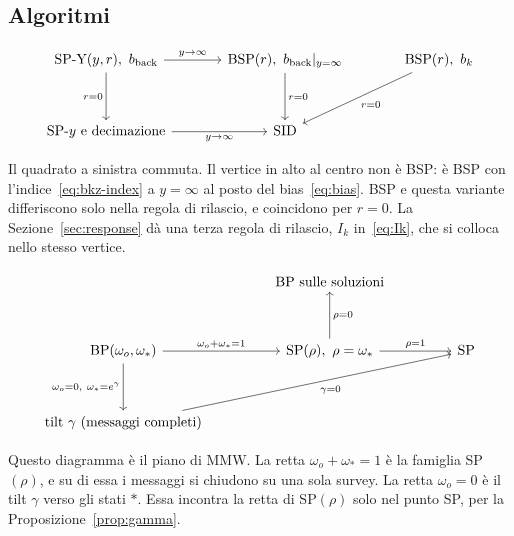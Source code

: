 \subsection{Algoritmi}

\begin{equation*}
\begin{tikzcd}[column sep=3.6em,row sep=3.4em]
\text{SP-Y}(y,r),\ b_{\mathrm{back}} \arrow[r,"y\to\infty"] \arrow[d,"r=0"'] & \text{BSP}(r),\ b_{\mathrm{back}}|_{y=\infty} \arrow[d,"r=0"] & \text{BSP}(r),\ b_k \arrow[dl,"r=0"] \\
\text{SP-}y\ \text{e decimazione} \arrow[r,"y\to\infty"'] & \text{SID} &
\end{tikzcd}
\end{equation*}

Il quadrato a sinistra commuta.
Il vertice in alto al centro non è BSP: è BSP con l'indice~\eqref{eq:bkz-index} a $y=\infty$ al posto del bias~\eqref{eq:bias}.
BSP e questa variante differiscono solo nella regola di rilascio, e coincidono per $r=0$.
La Sezione~\ref{sec:response} dà una terza regola di rilascio, $I_k$ in~\eqref{eq:Ik}, che si colloca nello stesso vertice.

\begin{equation*}
\begin{tikzcd}[column sep=4.4em,row sep=3.4em]
& \text{BP sulle soluzioni} & \\
\text{BP}(\omega_o,\omega_*) \arrow[r,"\omega_o+\omega_*=1"] \arrow[d,"{\omega_o=0,\ \omega_*=e^\gamma}"'] & \text{SP}(\rho),\ \rho=\omega_* \arrow[r,"\rho=1"] \arrow[u,"\rho=0"'] & \text{SP} \\
\text{tilt}\ \gamma\ \text{(messaggi completi)} \arrow[urr,"\gamma=0"'] & &
\end{tikzcd}
\end{equation*}

Questo diagramma è il piano di MMW.
La retta $\omega_o+\omega_*=1$ è la famiglia SP$(\rho)$, e su di essa i messaggi si chiudono su una sola survey.
La retta $\omega_o=0$ è il tilt $\gamma$ verso gli stati $*$.
Essa incontra la retta di SP$(\rho)$ solo nel punto SP, per la Proposizione~\ref{prop:gamma}.
